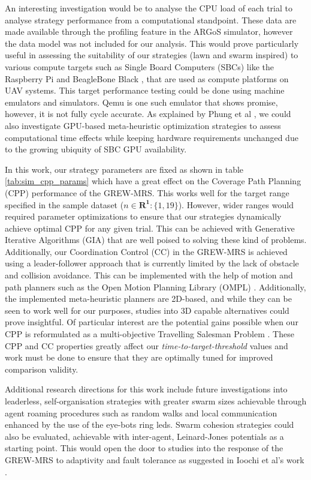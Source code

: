 \documentclass{report}
\begin{document}
An interesting investigation would be to analyse the CPU load of each trial to analyse strategy performance from a computational standpoint. These data are made available through the profiling feature in the ARGoS simulator, however the data model was not included for our analysis. This would prove particularly useful in assessing the suitability of our strategies (lawn and swarm inspired) to various compute targets such as Single Board Computers (SBCs) like the Raspberry Pi \cite{Gay2014} and BeagleBone Black \cite{Kridner}, that are used as compute platforms on UAV systems. This target performance testing could be done using machine emulators and simulators. Qemu \cite{Bellard2005} is one such emulator that shows promise, however, it is not fully cycle accurate. As explained by Phung et al \cite{Phung2017}, we could also investigate GPU-based meta-heuristic optimization strategies to assess computational time effects while keeping hardware requirements unchanged due to the growing ubiquity of SBC GPU availability.

In this work, our strategy parameters are fixed as shown in table \ref{tab:sim_cpp_params} which have a great effect on the Coverage Path Planning (CPP) performance of the GREW-MRS. This works well for the target range specified in the sample dataset ($n \in \boldsymbol{R^1}: \{1,19\}$). However, wider ranges would required parameter optimizations to ensure that our strategies dynamically achieve optimal CPP for any given trial. This can be achieved with Generative Iterative Algorithms (GIA) that are well poised to solving these kind of problems. Additionally, our Coordination Control (CC) in the GREW-MRS is achieved using a leader-follower approach that is currently limited by the lack of obstacle and collision avoidance. This can be implemented with the help of motion and path planners such as the Open Motion Planning Library (OMPL) \cite{Sucan2012}. Additionally, the implemented meta-heuristic planners are 2D-based, and while they can be seen to work well for our purposes, studies into 3D capable alternatives could prove insightful. Of particular interest are the potential gains possible when our CPP is reformulated as a multi-objective Travelling Salesman Problem \cite{Lust2010}. These CPP and CC properties greatly affect our \textit{time-to-target-threshold} values and work must be done to ensure that they are optimally tuned for improved comparison validity.

Additional research directions for this work include future investigations into leaderless, self-organisation strategies with greater swarm sizes achievable through agent roaming procedures such as random walks and local communication enhanced by the use of the eye-bots ring leds. Swarm cohesion strategies could also be evaluated, achievable with inter-agent, Leinard-Jones potentials as a starting point. This would open the door to studies into the response of the GREW-MRS to adaptivity and fault tolerance as suggested in Ioochi et al's work \cite{Iocchi2001}.
\end{document}
